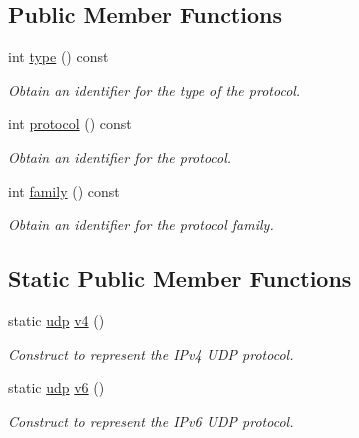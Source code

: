 \subsection*{Public Member Functions}
\begin{DoxyCompactItemize}
\item 
int \hyperlink{classasio_1_1ip_1_1udp_ab2ec5d4de92e3764b9c1ce893bc0e3d3}{type} () const 
\begin{DoxyCompactList}\small\item\em Obtain an identifier for the type of the protocol. \end{DoxyCompactList}\item 
int \hyperlink{classasio_1_1ip_1_1udp_a8ae12ae65ca77be06bed37b5b39dbaa9}{protocol} () const 
\begin{DoxyCompactList}\small\item\em Obtain an identifier for the protocol. \end{DoxyCompactList}\item 
int \hyperlink{classasio_1_1ip_1_1udp_aec7ea9c65873b353460f304721c415f9}{family} () const 
\begin{DoxyCompactList}\small\item\em Obtain an identifier for the protocol family. \end{DoxyCompactList}\end{DoxyCompactItemize}
\subsection*{Static Public Member Functions}
\begin{DoxyCompactItemize}
\item 
static \hyperlink{classasio_1_1ip_1_1udp}{udp} \hyperlink{classasio_1_1ip_1_1udp_a59d5e1cf1796499a03e41afdf0275713}{v4} ()
\begin{DoxyCompactList}\small\item\em Construct to represent the I\+Pv4 U\+D\+P protocol. \end{DoxyCompactList}\item 
static \hyperlink{classasio_1_1ip_1_1udp}{udp} \hyperlink{classasio_1_1ip_1_1udp_ab5a9085001a291525f1fdd60a3ebef84}{v6} ()
\begin{DoxyCompactList}\small\item\em Construct to represent the I\+Pv6 U\+D\+P protocol. \end{DoxyCompactList}\end{DoxyCompactItemize}
